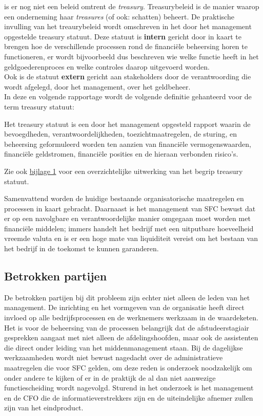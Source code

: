 \documentclass[10pt,a4paper,twoside]{report}
\begin{document}
is er nog niet een beleid omtrent de \textit{treasury}. Treasurybeleid is de manier waarop een onderneming haar \textit{treasures} (of ook: schatten) beheert. De praktische invulling van het treaurybeleid wordt omschreven in het door het management opgestelde treasury statuut. 
Deze statuut is \textbf{intern} gericht door in kaart te brengen hoe de verschillende processen rond de financiële beheersing horen te functioneren, er wordt bijvoorbeeld dus beschreven wie welke functie heeft in het geldgoederenproces en welke controles daarop uitgevoerd worden. \\
Ook is de statuut \textbf{extern} gericht aan stakeholders door de verantwoording die wordt afgelegd, door het management, over het geldbeheer. \citep{handreiking} \\
In deze en volgende rapportage wordt de volgende definitie gehanteerd voor de term treasury statuut: 

\begin{displayquote}
Het treasury statuut is een door het management opgesteld rapport waarin de bevoegdheden, verantwoordelijkheden, toezichtmaatregelen, de sturing, en beheersing geformuleerd worden ten aanzien van financiële vermogenswaarden, financiële geldstromen, financiële posities en de hieraan verbonden risico’s. \\
\citep{ede,handreiking} \label{def:treasury}
\end{displayquote}
\noindent
Zie ook \hyperlink{bij:treasury}{bijlage 1} voor een overzichtelijke uitwerking van het begrip treasury statuut.

Samenvattend worden de huidige bestaande organisatorische maatregelen en processen in kaart gebracht. Daarnaast is het management van SFC bewust dat er op een navolgbare en verantwoordelijke manier omgegaan moet worden met financiële middelen; immers handelt het bedrijf met een uitputbare hoeveelheid vreemde valuta en is er een hoge mate van liquiditeit vereist om het bestaan van het bedrijf in de toekomst te kunnen garanderen.

\subsection{Betrokken partijen}
De betrokken partijen bij dit probleem zijn echter niet alleen de leden van het management. De inrichting en het vormgeven van de organisatie heeft direct invloed op alle bedrijfsprocessen en de werknemers werkzaam in de waardeketen. Het is voor de beheersing van de processen belangrijk dat de afstudeerstagiair gesprekken aangaat met niet alleen de afdelingshoofden, maar ook de assistenten die direct onder leiding van het middenmanagement staan. Bij de dagelijkse werkzaamheden wordt niet bewust nagedacht over de administratieve maatregelen die voor SFC gelden, om deze reden is onderzoek noodzakelijk om onder andere te kijken of er in de praktijk de al dan niet aanwezige functiescheiding wordt nagevolgd. Sturend in het onderzoek is het management en de CFO die de informatieverstrekkers zijn en de uiteindelijke afnemer zullen zijn van het eindproduct. 
\end{document}

